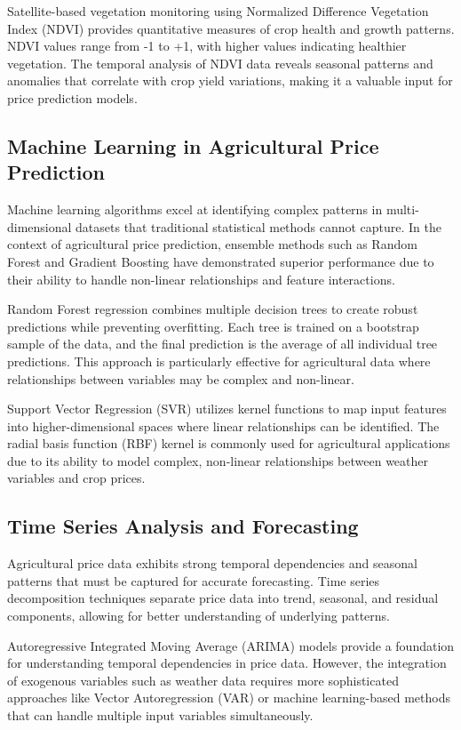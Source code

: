 Satellite-based vegetation monitoring using Normalized Difference Vegetation Index (NDVI) provides quantitative measures of crop health and growth patterns. NDVI values range from -1 to +1, with higher values indicating healthier vegetation. The temporal analysis of NDVI data reveals seasonal patterns and anomalies that correlate with crop yield variations, making it a valuable input for price prediction models.

\subsection{Machine Learning in Agricultural Price Prediction}

Machine learning algorithms excel at identifying complex patterns in multi-dimensional datasets that traditional statistical methods cannot capture. In the context of agricultural price prediction, ensemble methods such as Random Forest and Gradient Boosting have demonstrated superior performance due to their ability to handle non-linear relationships and feature interactions.

Random Forest regression combines multiple decision trees to create robust predictions while preventing overfitting. Each tree is trained on a bootstrap sample of the data, and the final prediction is the average of all individual tree predictions. This approach is particularly effective for agricultural data where relationships between variables may be complex and non-linear.

Support Vector Regression (SVR) utilizes kernel functions to map input features into higher-dimensional spaces where linear relationships can be identified. The radial basis function (RBF) kernel is commonly used for agricultural applications due to its ability to model complex, non-linear relationships between weather variables and crop prices.

\subsection{Time Series Analysis and Forecasting}

Agricultural price data exhibits strong temporal dependencies and seasonal patterns that must be captured for accurate forecasting. Time series decomposition techniques separate price data into trend, seasonal, and residual components, allowing for better understanding of underlying patterns.

Autoregressive Integrated Moving Average (ARIMA) models provide a foundation for understanding temporal dependencies in price data. However, the integration of exogenous variables such as weather data requires more sophisticated approaches like Vector Autoregression (VAR) or machine learning-based methods that can handle multiple input variables simultaneously.

